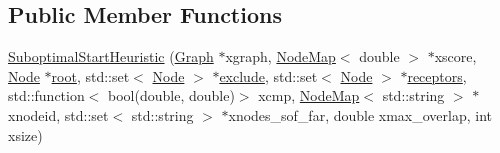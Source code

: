 \subsection*{Public Member Functions}
\begin{DoxyCompactItemize}
\item 
\hyperlink{classderegnet_1_1SuboptimalStartHeuristic_a3a05d150d544a21523f7babcf4910a45}{Suboptimal\+Start\+Heuristic} (\hyperlink{namespacederegnet_a55b76c55bbabc682cbc61f8b9948799e}{Graph} $\ast$xgraph, \hyperlink{namespacederegnet_ae102b707ae1d6f83c639ece5e0dd5658}{Node\+Map}$<$ double $>$ $\ast$xscore, \hyperlink{namespacederegnet_a744bad34f2de9856d36715a445f027f3}{Node} $\ast$\hyperlink{classderegnet_1_1DeregnetStartHeuristic_a4605d41352e3adf1f9f9f32466a4e61e}{root}, std\+::set$<$ \hyperlink{namespacederegnet_a744bad34f2de9856d36715a445f027f3}{Node} $>$ $\ast$\hyperlink{classderegnet_1_1DeregnetStartHeuristic_aa22c6581cd404bf7ac325850b28dc951}{exclude}, std\+::set$<$ \hyperlink{namespacederegnet_a744bad34f2de9856d36715a445f027f3}{Node} $>$ $\ast$\hyperlink{classderegnet_1_1DeregnetStartHeuristic_ab80c046ff2b7c64086fceb84987b3e50}{receptors}, std\+::function$<$ bool(double, double)$>$ xcmp, \hyperlink{namespacederegnet_ae102b707ae1d6f83c639ece5e0dd5658}{Node\+Map}$<$ std\+::string $>$ $\ast$xnodeid, std\+::set$<$ std\+::string $>$ $\ast$xnodes\+\_\+sof\+\_\+far, double xmax\+\_\+overlap, int xsize)
\end{DoxyCompactItemize}
